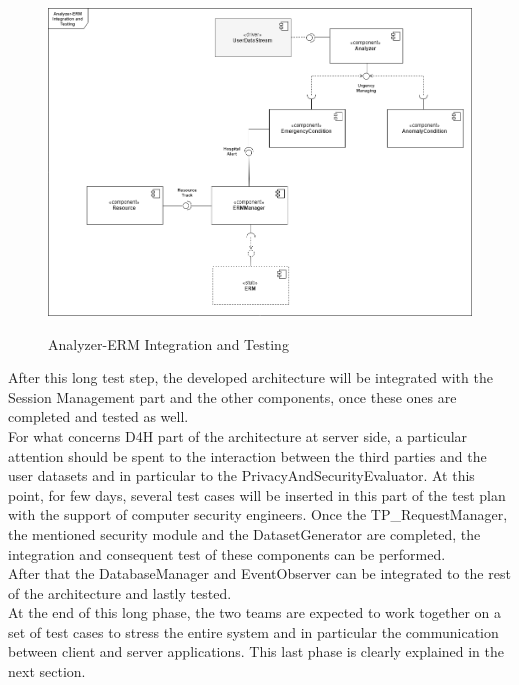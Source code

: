 {\begin{figure}[H]
	\centering
	\includegraphics[scale=0.4]{Images/uml/analyzer_integrationtesting.png}
	\label{figure20}
	\caption{Analyzer-ERM Integration and Testing}
\end{figure}

After this long test step, the developed architecture will be integrated with the Session Management part and the other components, once these ones are completed and tested as well.\\
For what concerns D4H part of the architecture at server side, a particular attention should be spent to the interaction between the third parties and the user datasets and in particular to the PrivacyAndSecurityEvaluator. At this point, for few days, several test cases will be inserted in this part of the test plan with the support of computer security engineers. Once the TP\_RequestManager, the mentioned security module and the DatasetGenerator are completed, the integration and consequent test of these components can be performed.\\
After that the DatabaseManager and EventObserver can be integrated to the rest of the architecture and lastly tested.\\
At the end of this long phase, the two teams are expected to work together on a set of test cases to stress the entire system and in particular the communication between client and server applications. This last phase is clearly explained in the next section.

}
